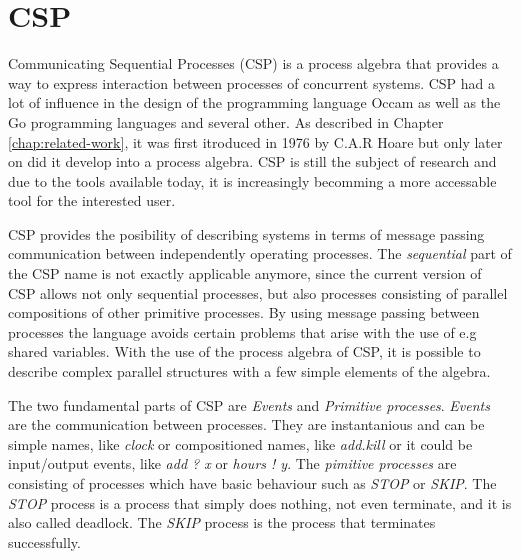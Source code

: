 \newpage
\section{CSP}
Communicating Sequential Processes (CSP)  is a process algebra that provides a way to express interaction between processes of concurrent systems.
CSP had a lot of influence in the design of the programming language Occam as well as the Go programming languages and several other. As described in Chapter \ref{chap:related-work}, it was first itroduced in 1976 by C.A.R Hoare but only later on did it develop into a process algebra. CSP is still the subject of research and due to the tools available today, it is increasingly becomming a more accessable tool for the interested user.

CSP provides the posibility of describing systems in terms of message passing communication between independently operating processes. The \textit{sequential} part of the CSP name is not exactly applicable anymore, since the current version of CSP allows not only sequential processes, but also processes consisting of parallel compositions of other primitive processes.
By using message passing between processes the language avoids certain problems that arise with the use of e.g shared variables.
With the use of the process algebra of CSP, it is possible to describe complex parallel structures with a few simple elements of the algebra.

The two fundamental parts of CSP are \textit{Events} and \textit{Primitive processes}. \textit{Events} are the communication between processes. They are instantanious and can be simple names, like \textit{clock} or compositioned names, like \textit{add.kill} or it could be input/output events, like \textit{add ? x} or \textit{hours ! y}. %
The \textit{pimitive processes} are consisting of processes which have basic behaviour such as \textit{STOP} or \textit{SKIP}. The \textit{STOP} process is a process that simply does nothing, not even terminate, and it is also called deadlock. The \textit{SKIP} process is the process that terminates successfully.


